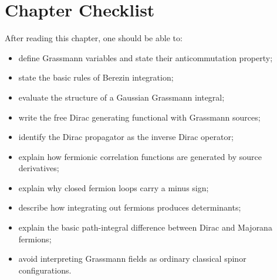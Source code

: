 \section{Chapter Checklist}

After reading this chapter, one should be able to:
\begin{itemize}
    \item define Grassmann variables and state their anticommutation property;
    \item state the basic rules of Berezin integration;
    \item evaluate the structure of a Gaussian Grassmann integral;
    \item write the free Dirac generating functional with Grassmann sources;
    \item identify the Dirac propagator as the inverse Dirac operator;
    \item explain how fermionic correlation functions are generated by source
    derivatives;
    \item explain why closed fermion loops carry a minus sign;
    \item describe how integrating out fermions produces determinants;
    \item explain the basic path-integral difference between Dirac and Majorana
    fermions;
    \item avoid interpreting Grassmann fields as ordinary classical spinor
    configurations.
\end{itemize}
